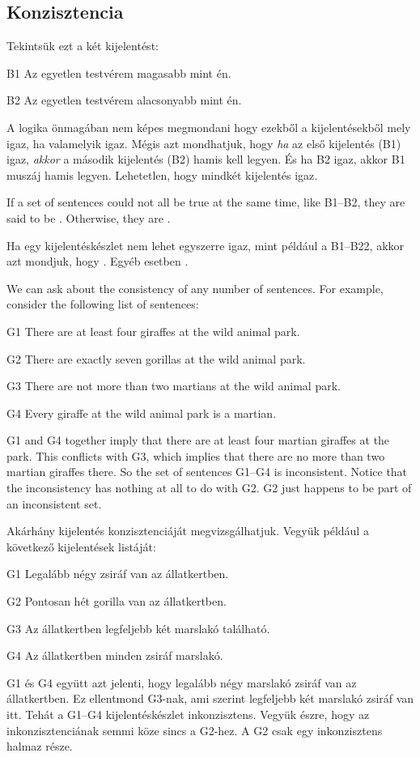 \subsection{Konzisztencia}
Tekintsük ezt a két kijelentést:
\begin{ekey}
\item[B1] Az egyetlen testvérem magasabb mint én.
\item[B2] Az egyetlen testvérem alacsonyabb mint én.
\end{ekey}
A logika önmagában nem képes megmondani hogy ezekből a kijelentésekből mely igaz, ha valamelyik igaz. Mégis azt mondhatjuk, hogy \emph{ha} az első kijelentés (B1) igaz, \emph{akkor} a második kijelentés (B2) hamis kell legyen. És ha B2 igaz, akkor B1 muszáj hamis legyen. Lehetetlen, hogy mindkét kijelentés igaz.

If a set of sentences could not all be true at the same time, like B1--B2, they are said to be . Otherwise, they are .

Ha egy kijelentéskészlet nem lehet egyszerre igaz, mint például a B1--B22, akkor azt mondjuk, hogy . Egyéb esetben .

We can ask about the consistency of any number of sentences. For example, consider the following list of sentences:
\label{MartianGiraffes}
\begin{ekey}
\item[G1] There are at least four giraffes at the wild animal park.
\item[G2] There are exactly seven gorillas at the wild animal park.
\item[G3] There are not more than two martians at the wild animal park.
\item[G4] Every giraffe at the wild animal park is a martian.
\end{ekey}
G1 and G4 together imply that there are at least four martian giraffes at the park. This conflicts with G3, which implies that there are no more than two martian giraffes there. So the set of sentences G1--G4 is inconsistent. Notice that the inconsistency has nothing at all to do with G2. G2 just happens to be part of an inconsistent set.

Akárhány kijelentés konzisztenciáját megvizsgálhatjuk. Vegyük például a következő kijelentések listáját:
\label{MartianGiraffes}
\begin{ekey}
\item[G1] Legalább négy zsiráf van az állatkertben.
\item[G2] Pontosan hét gorilla van az állatkertben.
\item[G3] Az állatkertben legfeljebb két marslakó található.
\item[G4] Az állatkertben minden zsiráf marslakó.
\end{ekey}
G1 és G4 együtt azt jelenti, hogy legalább négy marslakó zsiráf van az állatkertben. Ez ellentmond G3-nak, ami szerint legfeljebb két marslakó zsiráf van itt. Tehát a G1--G4 kijelentéskészlet inkonzisztens. Vegyük észre, hogy az inkonzisztenciának semmi köze sincs a G2-hez. A G2 csak egy inkonzisztens halmaz része.

